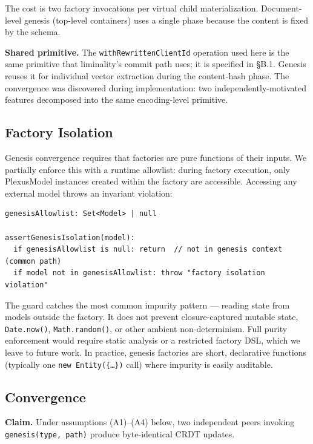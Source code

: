 The cost is two factory invocations per virtual child materialization. Document-level genesis (top-level containers) uses a single phase because the content is fixed by the schema.

\textbf{Shared primitive.} The \texttt{withRewrittenClientId} operation used here is the same primitive that liminality's commit path uses; it is specified in \cite{plexus:liminal} \S B.1. Genesis reuses it for individual vector extraction during the content-hash phase. The convergence was discovered during implementation: two independently-motivated features decomposed into the same encoding-level primitive.

\subsection{Factory Isolation}

Genesis convergence requires that factories are pure functions of their inputs. We partially enforce this with a runtime allowlist: during factory execution, only PlexusModel instances created within the factory are accessible. Accessing any external model throws an invariant violation:

\begin{lstlisting}
genesisAllowlist: Set<Model> | null

assertGenesisIsolation(model):
  if genesisAllowlist is null: return  // not in genesis context (common path)
  if model not in genesisAllowlist: throw "factory isolation violation"
\end{lstlisting}

The guard catches the most common impurity pattern --- reading state from models outside the factory. It does not prevent closure-captured mutable state, \texttt{Date.now()}, \texttt{Math.random()}, or other ambient non-determinism. Full purity enforcement would require static analysis or a restricted factory DSL, which we leave to future work. In practice, genesis factories are short, declarative functions (typically one \texttt{new Entity(\{\ldots\})} call) where impurity is easily auditable.

\subsection{Convergence}

\textbf{Claim.} Under assumptions (A1)--(A4) below, two independent peers invoking \texttt{genesis(type, path)} produce byte-identical CRDT updates.

